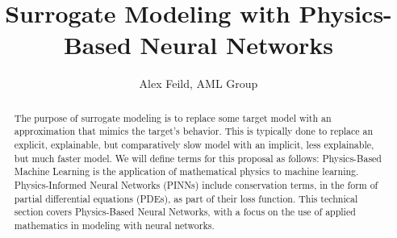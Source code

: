 \documentclass[]{article}
\title{Surrogate Modeling with Physics-Based Neural Networks}
\author{Alex Feild, AML Group}
\begin{document}
\maketitle

\begin{abstract}
The purpose of surrogate modeling is to replace some target model with an approximation that mimics the target's behavior.  This is typically done to replace an explicit, explainable, but comparatively slow model with an implicit, less explainable, but much faster model.  We will define terms for this proposal as follows:  Physics-Based Machine Learning is the application of mathematical physics to machine learning.  Physics-Informed Neural Networks (PINNs) include conservation terms, in the form of partial differential equations (PDEs), as part of their loss function.  This technical section covers Physics-Based Neural Networks, with a focus on the use of applied mathematics in modeling with neural networks.  

\end{abstract}
\end{document}
